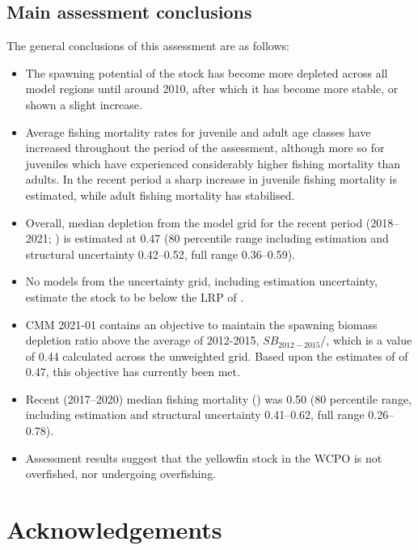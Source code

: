 \subsection{Main assessment conclusions}
\label{sec:main_conclusions}

The general conclusions of this assessment are as follows:

\begin{itemize}
  \item The spawning potential of the stock has become more depleted across all model regions until around 2010, after which it has become more stable, or shown a slight increase.
  \item Average fishing mortality rates for juvenile and adult age classes have increased throughout the period of the assessment, although more so for juveniles which have experienced considerably higher fishing mortality than adults. In the recent period a sharp increase in juvenile fishing mortality is estimated, while adult fishing mortality has stabilised.
  \item Overall, median depletion from the model grid for the recent period (2018--2021; \sbrsbfo) is estimated at 0.47 (80 percentile range including estimation and structural uncertainty 0.42--0.52, full range 0.36--0.59).
  \item No models from the uncertainty grid, including estimation uncertainty, estimate the stock to be below the LRP of \lrp.
  \item CMM 2021-01 contains an objective to maintain the spawning biomass depletion ratio above the average of 2012-2015, $\mathit{SB}_{2012-2015}$/\sbfo, which is a value of 0.44 calculated across the unweighted grid. Based upon the estimates of \sbrsbfo of 0.47, this objective has currently been met.
  \item Recent (2017--2020) median fishing mortality (\fref) was 0.50 (80 percentile range, including estimation and structural uncertainty 0.41--0.62, full range 0.26--0.78).
  \item Assessment results suggest that the yellowfin stock in the WCPO is not overfished, nor undergoing overfishing.
\end{itemize}

\clearpage

\section{Acknowledgements}

